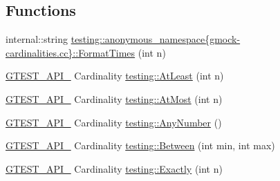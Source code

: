 \subsection*{Functions}
\begin{DoxyCompactItemize}
\item 
internal\+::string \hyperlink{namespacetesting_1_1anonymous__namespace_02gmock-cardinalities_8cc_03_a96225757688584c7c21d9a120bc74fd4}{testing\+::anonymous\+\_\+namespace\{gmock-\/cardinalities.\+cc\}\+::\+Format\+Times} (int n)
\item 
\hyperlink{gtest-port_8h_aa73be6f0ba4a7456180a94904ce17790}{G\+T\+E\+S\+T\+\_\+\+A\+P\+I\+\_\+} Cardinality \hyperlink{namespacetesting_a137297cb3c582843989fbd937cf0fed2}{testing\+::\+At\+Least} (int n)
\item 
\hyperlink{gtest-port_8h_aa73be6f0ba4a7456180a94904ce17790}{G\+T\+E\+S\+T\+\_\+\+A\+P\+I\+\_\+} Cardinality \hyperlink{namespacetesting_a5487cd1068c78821ced96fbf542a91bb}{testing\+::\+At\+Most} (int n)
\item 
\hyperlink{gtest-port_8h_aa73be6f0ba4a7456180a94904ce17790}{G\+T\+E\+S\+T\+\_\+\+A\+P\+I\+\_\+} Cardinality \hyperlink{namespacetesting_aa1f8a6371097e1e9b8d6866020f35252}{testing\+::\+Any\+Number} ()
\item 
\hyperlink{gtest-port_8h_aa73be6f0ba4a7456180a94904ce17790}{G\+T\+E\+S\+T\+\_\+\+A\+P\+I\+\_\+} Cardinality \hyperlink{namespacetesting_a3bb2d3cdd3fdf5b4be1480fce549918e}{testing\+::\+Between} (int min, int max)
\item 
\hyperlink{gtest-port_8h_aa73be6f0ba4a7456180a94904ce17790}{G\+T\+E\+S\+T\+\_\+\+A\+P\+I\+\_\+} Cardinality \hyperlink{namespacetesting_aa9b1b32ba9e8d3db8ac0af0fc8785c8d}{testing\+::\+Exactly} (int n)
\end{DoxyCompactItemize}
